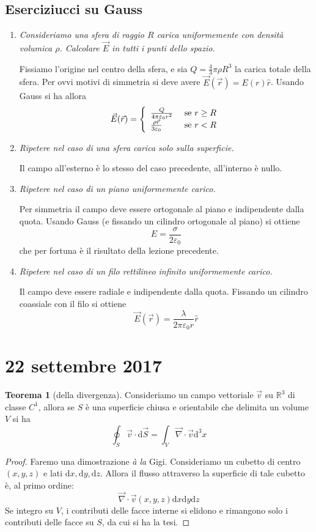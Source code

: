 \documentclass[a4paper,11pt]{book}
\let\oldnabla\nabla
\renewcommand{\nabla}{\vec{\oldnabla}}
\let\oldepsilon\epsilon
\let\oldvarepsilon\varepsilon
\renewcommand{\epsilon}{\oldvarepsilon}
\renewcommand{\varepsilon}{\oldepsilon}
\theoremstyle{definition}
\theoremstyle{theorem}
\newtheorem{teorema}{Teorema}[section]
\begin{document}
		\subsection{Eserciziucci su Gauss}
		\begin{enumerate}
			\item\textit{Consideriamo una sfera di raggio $R$ carica uniformemente con densità volumica $\rho$. Calcolare $\vec{E}$ in tutti i punti dello spazio.}
			
			Fissiamo l'origine nel centro della sfera, e sia $Q=\frac{4}{3}\pi\rho R^3$ la carica totale della sfera. Per ovvi motivi di simmetria si deve avere $\vec{E}(\vec{r})=E(r)\hat{r}$. Usando Gauss si ha allora
			\[\vec{E}(\vec{r})=\left\{\begin{array}{l l}
			\frac{Q}{4\pi\epsilon_0r^2}&\textrm{ se $r\geq R$}\\
			\frac{\rho\vec{r}}{3\epsilon_0}&\textrm{ se $r<R$}
			\end{array}\right.\]
			\item\textit{Ripetere nel caso di una sfera carica solo sulla superficie.}
			
			Il campo all'esterno è lo stesso del caso precedente, all'interno è nullo.
			
			\item\textit{Ripetere nel caso di un piano uniformemente carico.}
			
			Per simmetria il campo deve essere ortogonale al piano e indipendente dalla quota. Usando Gauss (e fissando un cilindro ortogonale al piano) si ottiene
			\[E=\frac{\sigma}{2\epsilon_0}\]
			che per fortuna è il risultato della lezione precedente.
			
			\item\textit{Ripetere nel caso di un filo rettilineo infinito uniformemente carico.}
			
			Il campo deve essere radiale e indipendente dalla quota. Fissando un cilindro coassiale con il filo si ottiene
			\[\vec{E}(\vec{r})=\frac{\lambda}{2\pi\epsilon_0r}\hat{r}\]
		\end{enumerate}
	\section{22 settembre 2017}
	\begin{teorema}[della divergenza]
	Consideriamo un campo vettoriale $\vec{v}$ su $\mathbb{R}^3$ di classe $C^1$, allora se $S$ è una superficie chiusa e orientabile che delimita un volume $V$ si ha
	\[\oint_S\vec{v}\cdot\mathrm{d}\vec{S}=\int_V\nabla\cdot\vec{v}\mathrm{d}^3x\]
	\end{teorema}
	\begin{proof}
		Faremo una dimostrazione \textit{à la} Gigi. Consideriamo un cubetto di centro $(x,y,z)$ e lati $\mathrm{d}x,\mathrm{d}y,\mathrm{d}z$. Allora il flusso attraverso la superficie di tale cubetto è, al primo ordine:
		\[\nabla\cdot\vec{v}(x,y,z)\mathrm{d}x\mathrm{d}y\mathrm{d}z\]
		Se integro su $V$, i contributi delle facce interne si elidono e rimangono solo i contributi delle facce su $S$, da cui si ha la tesi.
	\end{proof}
\end{document}
